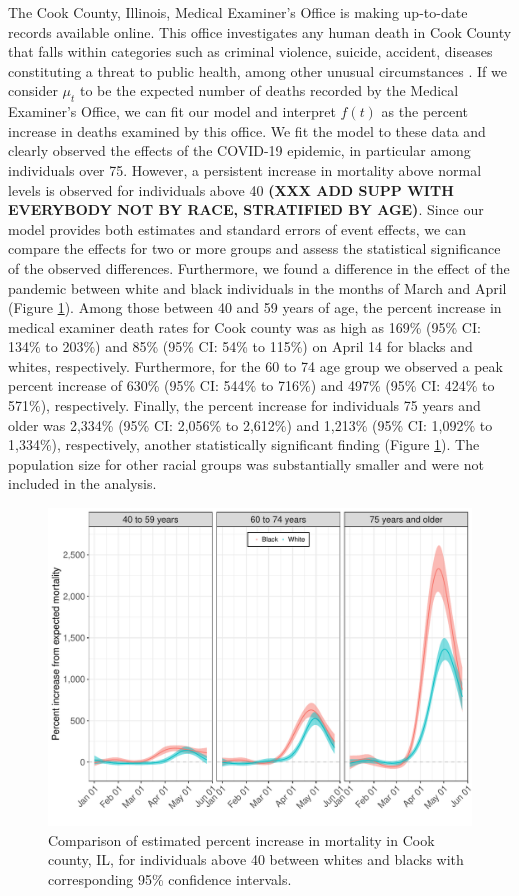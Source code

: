 \documentclass[11pt]{article}
\begin{document}
The Cook County, Illinois, Medical Examiner's Office is making up-to-date records available online. This office investigates any human death in Cook County that falls within categories such as criminal violence, suicide, accident, diseases constituting a threat to public health, among other unusual circumstances \cite{cookcovid19}. If we consider $\mu_t$ to be the expected number of deaths recorded by the Medical Examiner's Office, we can fit our model and interpret $f(t)$ as the percent increase in deaths examined by this office. We fit the model to these data and clearly observed the effects of the COVID-19 epidemic, in particular among individuals over 75. However, a persistent increase in mortality above normal levels is observed for individuals above 40 \textbf{(XXX ADD SUPP WITH EVERYBODY NOT BY RACE, STRATIFIED BY AGE)}. Since our model provides both estimates and standard errors of event effects, we can compare the effects for two or more groups and assess the statistical significance of the observed differences. Furthermore, we found a difference in the effect of the pandemic between white and black individuals in the months of March and April (Figure \ref{fig:cook-white-v-black}). Among those between 40 and 59 years of age, the percent increase in medical examiner death rates for Cook county was as high as 169\% (95\% CI: 134\% to 203\%) and 85\%  (95\% CI: 54\% to 115\%) on April 14 for blacks and whites, respectively. Furthermore, for the 60 to 74 age group we observed a peak percent increase of 630\% (95\% CI: 544\% to 716\%) and 497\% (95\% CI: 424\% to 571\%), respectively. Finally, the percent increase for individuals 75 years and older was 2,334\% (95\% CI: 2,056\% to 2,612\%) and 1,213\% (95\% CI: 1,092\% to 1,334\%), respectively, another statistically significant finding (Figure \ref{fig:cook-white-v-black}).  The population size for other racial groups was substantially smaller and were not included in the analysis.

\begin{figure}[ht]
	\centering	
		\includegraphics[width=1\linewidth]{figs/figure-3.pdf} 
	\caption{Comparison of estimated percent increase in mortality in Cook county, IL, for individuals above 40 between whites and blacks with corresponding 95\% confidence intervals.}
	\label{fig:cook-white-v-black}
\end{figure}
\end{document}
